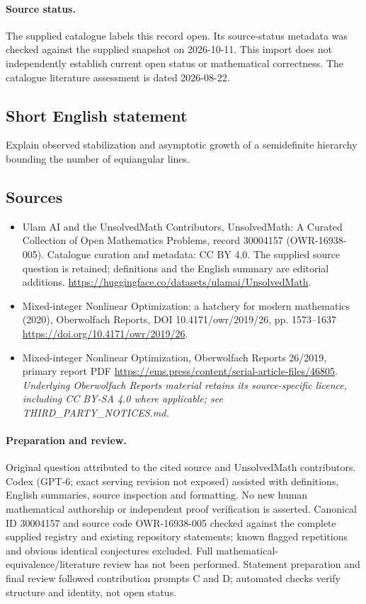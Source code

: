 \documentclass[11pt]{article}
\begin{document}
\paragraph{Source status.}
The supplied catalogue labels this record open. Its source-status metadata was checked against the supplied snapshot on 2026-10-11. This import does not independently establish current open status or mathematical correctness. The catalogue literature assessment is dated 2026-08-22.
\subsection{Short English statement}
Explain observed stabilization and asymptotic growth of a semidefinite hierarchy bounding the number of equiangular lines.
\subsection{Sources}
\begin{itemize}
\item[\hypertarget{source:30004157:1}{S1}] Ulam AI and the UnsolvedMath Contributors, UnsolvedMath: A Curated Collection of Open Mathematics Problems, record 30004157 (OWR-16938-005). Catalogue curation and metadata: CC BY 4.0. The supplied source question is retained; definitions and the English summary are editorial additions.
\url{https://huggingface.co/datasets/ulamai/UnsolvedMath}.
\item[\hypertarget{source:30004157:2}{S2}] Mixed-integer Nonlinear Optimization: a hatchery for modern mathematics (2020), Oberwolfach Reports, DOI 10.4171/owr/2019/26, pp. 1573--1637
\url{https://doi.org/10.4171/owr/2019/26}.
\item[\hypertarget{source:30004157:3}{S3}] Mixed-integer Nonlinear Optimization, Oberwolfach Reports 26/2019, primary report PDF
\url{https://ems.press/content/serial-article-files/46805}.
\textit{Underlying Oberwolfach Reports material retains its source-specific licence, including CC BY-SA 4.0 where applicable; see THIRD\_PARTY\_NOTICES.md.}
\end{itemize}
\paragraph{Preparation and review.}
Original question attributed to the cited source and UnsolvedMath contributors. Codex (GPT-6; exact serving revision not exposed) assisted with definitions, English summaries, source inspection and formatting. No new human mathematical authorship or independent proof verification is asserted. Canonical ID 30004157 and source code OWR-16938-005 checked against the complete supplied registry and existing repository statements; known flagged repetitions and obvious identical conjectures excluded. Full mathematical-equivalence/literature review has not been performed. Statement preparation and final review followed contribution prompts C and D; automated checks verify structure and identity, not open status.
\label{end:30004157}
\end{document}
